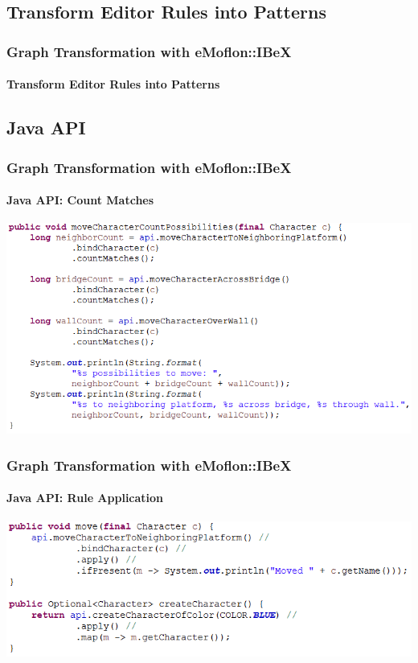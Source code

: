 \subsection{Transform Editor Rules into Patterns}
	\begin{frame}
		\frametitle{Graph Transformation with eMoflon::IBeX}
		\framesubtitle{Transform Editor Rules into Patterns}
		\begin{center}
			\resizebox{!}{0.75\textheight}{
				
			}
		\end{center}
	\end{frame}

\subsection{Java API}
	\begin{frame}
		\frametitle{Graph Transformation with eMoflon::IBeX}
		\framesubtitle{Java API: Count Matches}
		\includegraphics[width=\textwidth]{../common/code/example-countMatches}
	\end{frame}
	\begin{frame}
		\frametitle{Graph Transformation with eMoflon::IBeX}
		\framesubtitle{Java API: Rule Application}
		\includegraphics[width=\textwidth]{../common/code/example-rule-application}
	\end{frame}
